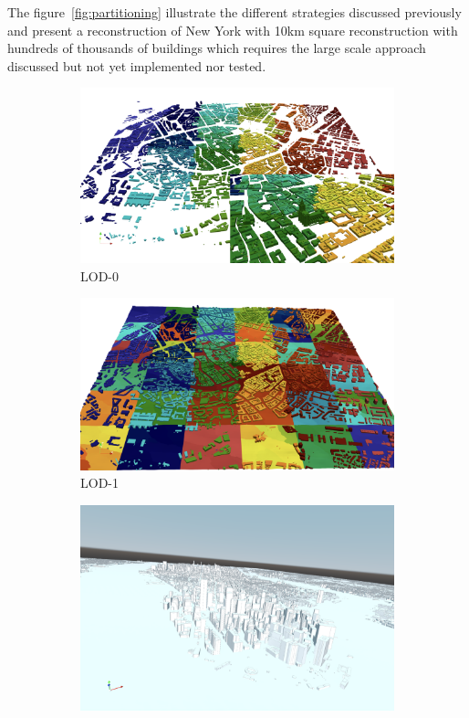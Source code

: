 \documentclass[runningheads]{llncs}
\begin{document}
The figure~\ref{fig:partitioning} illustrate the different strategies discussed previously and present a reconstruction of New York with 10km square reconstruction with hundreds of thousands of buildings which requires the large scale approach discussed but not yet implemented nor tested.
\begin{figure}[htbp]
\centering
\begin{subfigure}{.4\textwidth}
  \centering
  \includegraphics[width=\linewidth]{images/city-strasbourg-lod0-parts.png}
  \caption{LOD-0}
  \label{fig:city-strasbourg-lod0-parts}
\end{subfigure}%
\begin{subfigure}{.4\textwidth}
  \centering
  \includegraphics[width=\linewidth]{images/city-strasbourg-lod1-parts.png}
  \caption{LOD-1}
  \label{fig:city-strasbourg-lod1-parts}
\end{subfigure}
\begin{subfigure}{.4\textwidth}
  \centering
  \includegraphics[width=\linewidth]{images/city-newyork-largescale.png}

\end{subfigure}
\end{figure}
\end{document}
